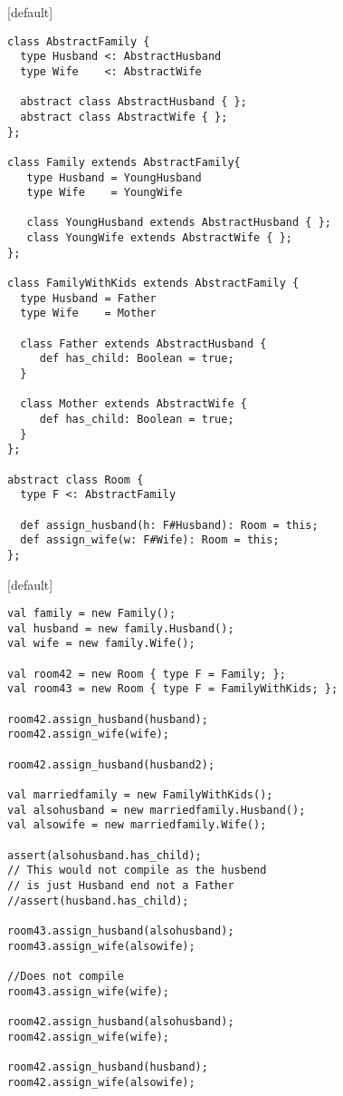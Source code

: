 \documentclass{beamer}
\makeatletter
\newenvironment{withoutheadline}{
        \setbeamertemplate{headline}[default]
        \def\beamer@entrycode{\vspace*{-\headheight}}
    }{}
\makeatother
\begin{document}
\begin{withoutheadline}
\begin{frame}[fragile]{}
\centering
\begin{verbatim}
class AbstractFamily {
  type Husband <: AbstractHusband
  type Wife    <: AbstractWife

  abstract class AbstractHusband { };
  abstract class AbstractWife { };
};

class Family extends AbstractFamily{
   type Husband = YoungHusband
   type Wife    = YoungWife

   class YoungHusband extends AbstractHusband { };
   class YoungWife extends AbstractWife { };
};

class FamilyWithKids extends AbstractFamily {
  type Husband = Father
  type Wife    = Mother

  class Father extends AbstractHusband {
     def has_child: Boolean = true;
  }

  class Mother extends AbstractWife {
     def has_child: Boolean = true;
  }
};

abstract class Room {
  type F <: AbstractFamily

  def assign_husband(h: F#Husband): Room = this;
  def assign_wife(w: F#Wife): Room = this;
};
\end{verbatim}
\end{frame}
\end{withoutheadline}

\begin{withoutheadline}
\begin{frame}[fragile]{}
\centering
\begin{verbatim}
val family = new Family();
val husband = new family.Husband();
val wife = new family.Wife();

val room42 = new Room { type F = Family; };
val room43 = new Room { type F = FamilyWithKids; };

room42.assign_husband(husband);
room42.assign_wife(wife);

room42.assign_husband(husband2);

val marriedfamily = new FamilyWithKids();
val alsohusband = new marriedfamily.Husband();
val alsowife = new marriedfamily.Wife();

assert(alsohusband.has_child);
// This would not compile as the husbend
// is just Husband end not a Father
//assert(husband.has_child);

room43.assign_husband(alsohusband);
room43.assign_wife(alsowife);

//Does not compile
room43.assign_wife(wife);

room42.assign_husband(alsohusband);
room42.assign_wife(wife);

room42.assign_husband(husband);
room42.assign_wife(alsowife);
\end{verbatim}
\end{frame}
\end{withoutheadline}
\end{document}

